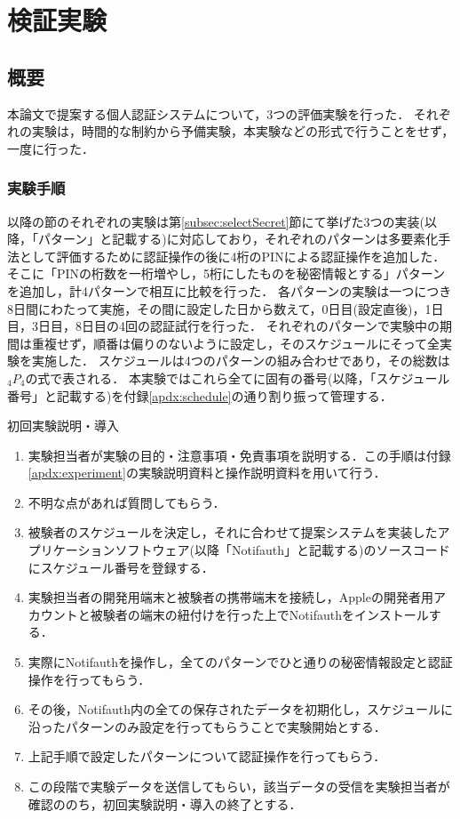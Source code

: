 \chapter{検証実験}\label{chap:experiment}

\section{概要}
本論文で提案する個人認証システムについて，3つの評価実験を行った．
それぞれの実験は，時間的な制約から予備実験，本実験などの形式で行うことをせず，一度に行った．

\subsection{実験手順}
以降の節のそれぞれの実験は第\ref{subsec:selectSecret}節にて挙げた3つの実装(以降，「パターン」と記載する)に対応しており，それぞれのパターンは多要素化手法として評価するために認証操作の後に4桁のPINによる認証操作を追加した．
そこに「PINの桁数を一桁増やし，5桁にしたものを秘密情報とする」パターンを追加し，計4パターンで相互に比較を行った．
各パターンの実験は一つにつき8日間にわたって実施，その間に設定した日から数えて，0日目(設定直後)，1日目，3日目，8日目の4回の認証試行を行った．
それぞれのパターンで実験中の期間は重複せず，順番は偏りのないように設定し，そのスケジュールにそって全実験を実施した．
スケジュールは4つのパターンの組み合わせであり，その総数は$ {}_4 P _4 $の式で表される．
本実験ではこれら全てに固有の番号(以降，「スケジュール番号」と記載する)を付録\ref{apdx:schedule}の通り割り振って管理する．

初回実験説明・導入
\begin{enumerate}
  \item 実験担当者が実験の目的・注意事項・免責事項を説明する．この手順は付録\ref{apdx:experiment}の実験説明資料と操作説明資料を用いて行う．
  \item 不明な点があれば質問してもらう．
  \item 被験者のスケジュールを決定し，それに合わせて提案システムを実装したアプリケーションソフトウェア(以降「Notifauth」と記載する)のソースコードにスケジュール番号を登録する．
  \item 実験担当者の開発用端末と被験者の携帯端末を接続し，Appleの開発者用アカウントと被験者の端末の紐付けを行った上でNotifauthをインストールする．
  \item 実際にNotifauthを操作し，全てのパターンでひと通りの秘密情報設定と認証操作を行ってもらう．
  \item その後，Notifauth内の全ての保存されたデータを初期化し，スケジュールに沿ったパターンのみ設定を行ってもらうことで実験開始とする．
  \item 上記手順で設定したパターンについて認証操作を行ってもらう．
  \item この段階で実験データを送信してもらい，該当データの受信を実験担当者が確認ののち，初回実験説明・導入の終了とする．
\end{enumerate}

